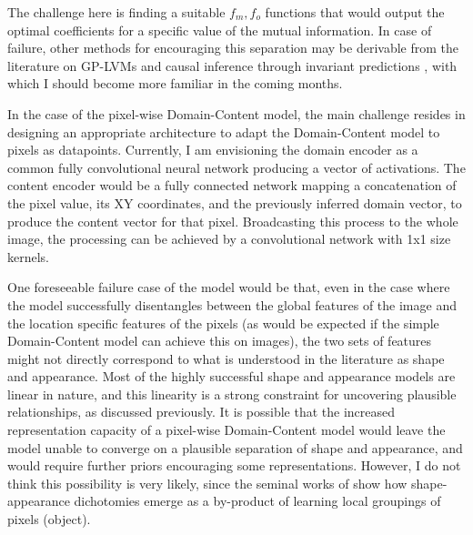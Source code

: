 \documentclass[withindex,glossary,firstyr,times]{cam-thesis}
\begin{document}
The challenge here is finding a suitable $f_m, f_o$ functions that would output the optimal coefficients for a specific value of the mutual information. In case of failure, other methods for encouraging this separation may be derivable from the literature on GP-LVMs \cite{lawrence2004gaussian} and causal inference through invariant predictions \cite{peters2016causal, magliacane2018domain, arjovsky2019invariant}, with which I should become more familiar in the coming months.

In the case of the pixel-wise Domain-Content model, the main challenge resides in designing an appropriate architecture to adapt the Domain-Content model to pixels as datapoints. Currently, I am envisioning the domain encoder as a common fully convolutional neural network producing a vector of activations. The content encoder would be a fully connected network mapping a concatenation of the pixel value, its XY coordinates, and the previously inferred domain vector, to produce the content vector for that pixel. Broadcasting this process to the whole image, the processing can be achieved by a convolutional network with 1x1 size kernels.

One foreseeable failure case of the model would be that, even in the case where the model successfully disentangles between the global features of the image and the location specific features of the pixels (as would be expected if the simple Domain-Content model can achieve this on images), the two sets of features might not directly correspond to what is understood in the literature as shape and appearance. Most of the highly successful shape and appearance models \cite{cootes1999comparing, jojic2003epitomic, kannan2007clustering} are linear in nature, and this linearity is a strong constraint for uncovering plausible relationships, as discussed previously. It is possible that the increased representation capacity of a pixel-wise Domain-Content model would leave the model unable to converge on a plausible separation of shape and appearance, and would require further priors encouraging some representations. However, I do not think this possibility is very likely, since the seminal works of \citet{eslami2016attend, greff2016tagger} show how shape-appearance dichotomies emerge as a by-product of learning local groupings of pixels (object).

\end{document}
